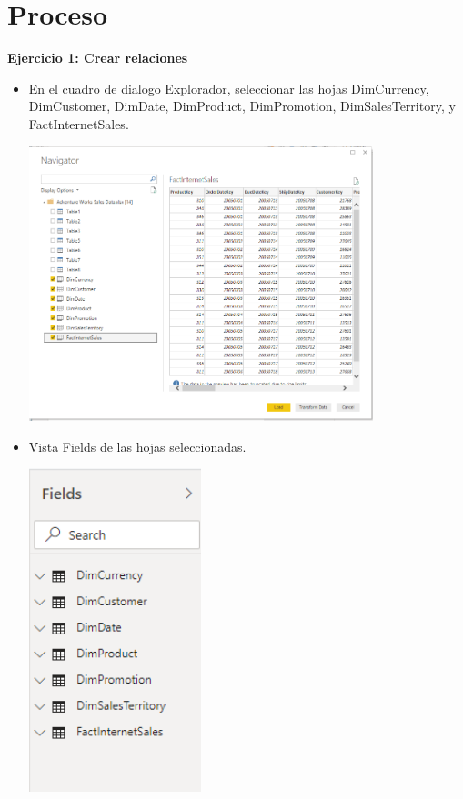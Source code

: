 \section{Proceso} 

\textbf{Ejercicio 1: Crear relaciones}

\begin{itemize}
	\item En el cuadro de dialogo Explorador, seleccionar las hojas DimCurrency, DimCustomer, DimDate, DimProduct, DimPromotion, DimSalesTerritory, y FactInternetSales.
	\begin{center}
	\includegraphics[width=10cm]{./Imagenes/Captura1} 
	\end{center}
\end{itemize} 

\begin{itemize}
	\item Vista Fields de las hojas seleccionadas.
	\begin{center}
	\includegraphics[width=5cm]{./Imagenes/Captura2} 
	\end{center}
\end{itemize} 

